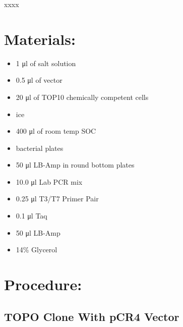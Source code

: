 \documentclass[
  letterpaper,
  DIV=11,
  numbers=noendperiod]{scrreprt}
\providecommand{\tightlist}{%
  \setlength{\itemsep}{0pt}\setlength{\parskip}{0pt}}\usepackage{longtable,booktabs,array}
\begin{document}
\begin{tcolorbox}[enhanced jigsaw, toprule=.15mm, breakable, coltitle=black, leftrule=.75mm, title=\textcolor{quarto-callout-warning-color}{\faExclamationTriangle}\hspace{0.5em}{NOTES}, bottomrule=.15mm, toptitle=1mm, bottomtitle=1mm, colframe=quarto-callout-warning-color-frame, opacityback=0, colback=white, opacitybacktitle=0.6, colbacktitle=quarto-callout-warning-color!10!white, rightrule=.15mm, titlerule=0mm, arc=.35mm, left=2mm]

xxxx

\end{tcolorbox}

\hypertarget{materials-25}{%
\section{Materials:}\label{materials-25}}

\begin{itemize}
\tightlist
\item
  1 μl of salt solution
\item
  0.5 μl of vector
\item
  20 μl of TOP10 chemically competent cells
\item
  ice
\item
  400 μl of room temp SOC
\item
  bacterial plates
\item
  50 μl LB-Amp in round bottom plates
\item
  10.0 μl Lab PCR mix
\item
  0.25 μl T3/T7 Primer Pair
\item
  0.1 μl Taq
\item
  50 μl LB-Amp
\item
  14\% Glycerol
\end{itemize}

\hypertarget{procedure-24}{%
\section{Procedure:}\label{procedure-24}}

\hypertarget{topo-clone-with-pcr4-vector}{%
\subsection{TOPO Clone With pCR4
Vector}\label{topo-clone-with-pcr4-vector}}
\end{document}
